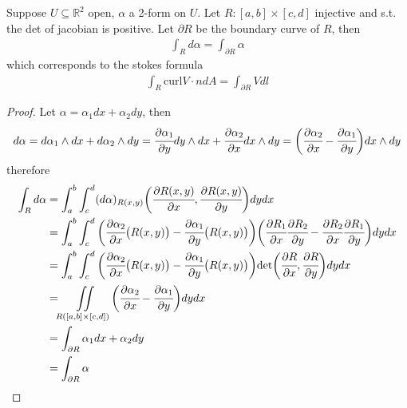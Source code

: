 \documentclass[10pt]{article}
\begin{document}
		\begin{theorem}
			Suppose $U\subseteq\mathbb{R}^2$ open, $\alpha$ a 2-form on $U$. Let $R: [a,b]\times[c,d]$ injective and s.t. the det of jacobian is positive. Let $\partial R$ be the boundary curve of $R$, then
			\begin{equation*}
				\begin{aligned}
					\int_{R}d\alpha = \int_{\partial R}\alpha
				\end{aligned}
			\end{equation*}
			which corresponds to the stokes formula
			\begin{equation*}
				\begin{aligned}
					\int_{R}\text{curl} V\cdot n dA = \int_{\partial R}Vdl
				\end{aligned}
			\end{equation*}
		\end{theorem}
		\begin{proof}
			Let $\alpha = \alpha_1dx + \alpha_2dy$, then
			\begin{equation*}
				\begin{aligned}
					d\alpha = d\alpha_1\wedge dx + d\alpha_2\wedge dy = \cfrac{\partial\alpha_1}{\partial y}dy\wedge dx + \cfrac{\partial\alpha_2}{\partial x}dx\wedge dy = \bigg( \cfrac{\partial\alpha_2}{\partial x} - \cfrac{\partial\alpha_1}{\partial y} \bigg)dx\wedge dy
				\end{aligned}
			\end{equation*}
			therefore
			\begin{equation*}
				\begin{aligned}
					\int_{R}d\alpha &= \int_{a}^{b}\int_{c}^{d}(d\alpha)_{R(x,y)}\bigg( \cfrac{\partial R(x,y)}{\partial x}, \cfrac{\partial R(x,y)}{\partial y} \bigg) dydx \\
					&= \int_{a}^{b}\int_{c}^{d} \bigg( \cfrac{\partial\alpha_2}{\partial x}\big(R(x,y)\big) - \cfrac{\partial\alpha_1}{\partial y}\big(R(x,y)\big) \bigg)\bigg( \cfrac{\partial R_1}{\partial x} \cfrac{\partial R_2}{\partial y} - \cfrac{\partial R_2}{\partial x} \cfrac{\partial R_1}{\partial y} \bigg)dydx \\
					&= \int_{a}^{b}\int_{c}^{d} \bigg( \cfrac{\partial\alpha_2}{\partial x}\big(R(x,y)\big) - \cfrac{\partial\alpha_1}{\partial y}\big(R(x,y)\big) \bigg)\text{det}\bigg(\cfrac{\partial R}{\partial x}, \cfrac{\partial R}{\partial y}\bigg)dydx \\
					&= \iint\limits_{R([a,b]\times[c,d])} \bigg( \cfrac{\partial\alpha_2}{\partial x} - \cfrac{\partial\alpha_1}{\partial y} \bigg)dydx \\
					&= \int_{\partial R}\alpha_1dx+\alpha_2dy \\
					&= \int_{\partial R} \alpha
				\end{aligned}
			\end{equation*}
		\end{proof}
\end{document}
